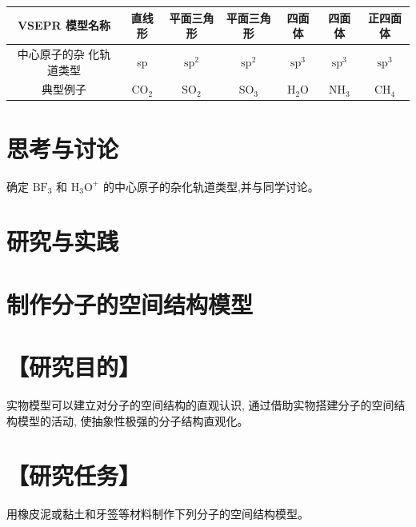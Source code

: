 \documentclass[10pt]{article}
\begin{document}
\begin{center}
{\begin{tabular}{|c|c|c|c|c|c|c|}
\hline
VSEPR 模型名称 & 直线形 & 平面三角形 & 平面三角形 & 四面体 & 四面体 & 正四面体 \\
\hline
中心原子的杂 化轨道类型 & sp & \({\mathrm{{sp}}}^{2}\) & \({\mathrm{{sp}}}^{2}\) & \({\mathrm{{sp}}}^{3}\) & \({\mathrm{{sp}}}^{3}\) & \({\mathrm{{sp}}}^{3}\) \\
\hline
典型例子 & \({\mathrm{{CO}}}_{2}\) & \({\mathrm{{SO}}}_{2}\) & \({\mathrm{{SO}}}_{3}\) & \({\mathrm{H}}_{2}\mathrm{O}\) & \({\mathrm{{NH}}}_{3}\) & \({\mathrm{{CH}}}_{4}\) \\
\hline
\end{tabular}
}
\end{center}

\section*{思考与讨论}

确定 \({\mathrm{{BF}}}_{3}\) 和 \({\mathrm{H}}_{3}{\mathrm{O}}^{ + }\) 的中心原子的杂化轨道类型,并与同学讨论。

\section*{研究与实践}

\section*{制作分子的空间结构模型}

\section*{【研究目的】}

实物模型可以建立对分子的空间结构的直观认识, 通过借助实物搭建分子的空间结构模型的活动, 使抽象性极强的分子结构直观化。

\section*{【研究任务】}

用橡皮泥或黏土和牙签等材料制作下列分子的空间结构模型。

\begin{center}
\end{center}
\end{document}
